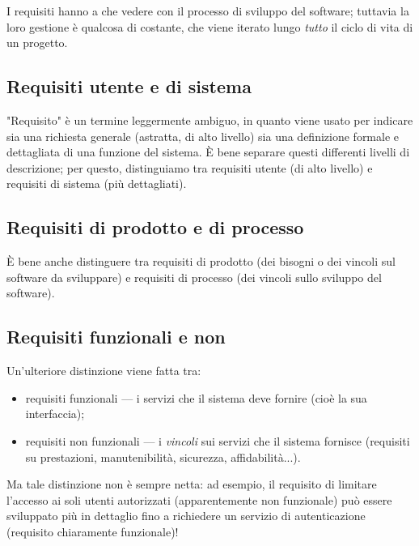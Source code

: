 \documentclass[a4paper]{article}
\begin{document}
		
I requisiti hanno a che vedere con il processo di sviluppo del software; tuttavia la loro gestione è qualcosa di costante, che viene iterato lungo \emph{tutto} il ciclo di vita di un progetto.

		
	\subsection{Requisiti utente e di sistema}

		
"Requisito" è un termine leggermente ambiguo, in quanto viene usato per indicare sia una richiesta generale (astratta, di alto livello) sia una definizione formale e dettagliata di una funzione del sistema. È bene separare questi differenti livelli di descrizione; per questo, distinguiamo tra requisiti utente (di alto livello) e requisiti di sistema (più dettagliati).

		
	\subsection{Requisiti di prodotto e di processo}

		
È bene anche distinguere tra requisiti di prodotto (dei bisogni o dei vincoli sul software da sviluppare) e requisiti di processo (dei vincoli sullo sviluppo del software).

		
	\subsection{Requisiti funzionali e non}

		
Un'ulteriore distinzione viene fatta tra:
		
	\begin{itemize}
		
			
	\item requisiti funzionali --- i servizi che il sistema deve fornire (cioè la sua interfaccia);
			
	\item requisiti non funzionali --- i \emph{vincoli} sui servizi che il sistema fornisce (requisiti su prestazioni, manutenibilità, sicurezza, affidabilità...).
		
	\end{itemize}

		
Ma tale distinzione non è sempre netta: ad esempio, il requisito di limitare l'accesso ai soli utenti autorizzati (apparentemente non funzionale) può essere sviluppato più in dettaglio fino a richiedere un servizio di autenticazione (requisito chiaramente funzionale)!
\end{document}
